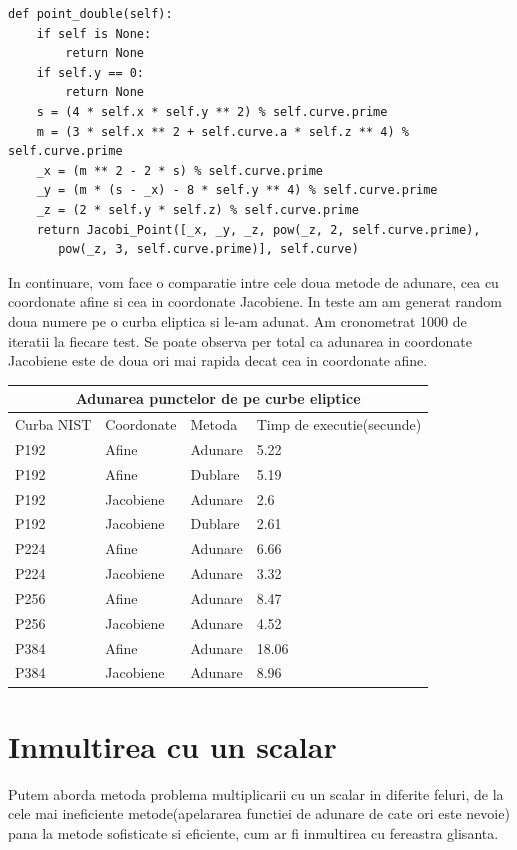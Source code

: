 \begin{lstlisting}
def point_double(self):
    if self is None:
        return None
    if self.y == 0:
        return None
    s = (4 * self.x * self.y ** 2) % self.curve.prime
    m = (3 * self.x ** 2 + self.curve.a * self.z ** 4) % self.curve.prime
    _x = (m ** 2 - 2 * s) % self.curve.prime
    _y = (m * (s - _x) - 8 * self.y ** 4) % self.curve.prime
    _z = (2 * self.y * self.z) % self.curve.prime
    return Jacobi_Point([_x, _y, _z, pow(_z, 2, self.curve.prime), 
	   pow(_z, 3, self.curve.prime)], self.curve)
\end{lstlisting}

In continuare, vom face o comparatie intre cele doua metode de adunare, cea cu coordonate afine si cea in coordonate Jacobiene. In teste am am generat random doua numere pe o curba eliptica si le-am adunat. Am cronometrat 1000 de iteratii la fiecare test. Se poate observa per total ca adunarea in coordonate Jacobiene este de doua ori mai rapida decat cea in coordonate afine.

\begin{tabular}{ |p{3cm}||p{3cm}|p{3cm}|p{3cm}|  }
 \hline
 \multicolumn{4}{|c|}{Adunarea punctelor de pe curbe eliptice} \\
 \hline
 Curba NIST& Coordonate &Metoda &Timp de executie(secunde)\\
 \hline
 P192   & Afine    &Adunare& 5.22\\
 P192&Afine  & Dublare & 5.19\\
 P192 &Jacobiene & Adunare& 2.6\\
 P192&Jacobiene & Dublare & 2.61\\
 P224& Afine & Adunare & 6.66\\
 P224& Jacobiene & Adunare   &3.32\\
 P256& Afine  & Adunare& 8.47\\
 P256& Jacobiene  & Adunare& 4.52\\
 P384& Afine  & Adunare& 18.06\\
 P384& Jacobiene  & Adunare& 8.96\\
 \hline
\end{tabular}

\section{Inmultirea cu un scalar}
\label{subsec:subsec03}


Putem aborda metoda problema multiplicarii cu un scalar in diferite feluri, de la cele mai ineficiente metode(apelararea functiei de adunare de cate ori este nevoie) pana la metode sofisticate si eficiente, cum ar fi inmultirea cu fereastra glisanta.

